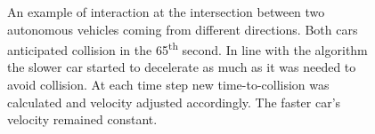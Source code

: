 \documentclass[11pt,english,twoside]{article}
\begin{document}
\begin{figure}[!] %
\caption{An example of interaction at the intersection between two autonomous vehicles coming from different directions. Both cars anticipated collision in the 65\textsuperscript{th} second. In line with the algorithm the slower car started to decelerate as much as it was needed to avoid collision. At each time step new time-to-collision was calculated and velocity adjusted accordingly. The faster car's velocity remained constant.}
\label{fig:interactions_example_2}
\end{figure}















\end{document}

